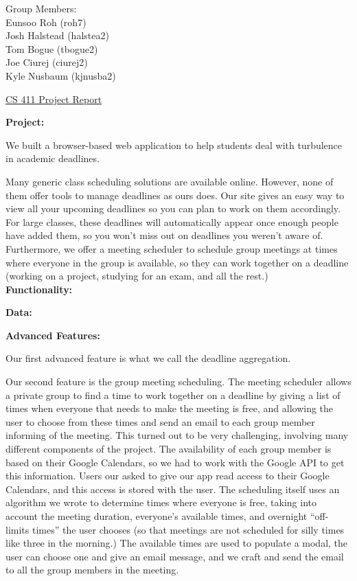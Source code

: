 \documentclass{article}
\begin{document}
\begin{flushright}
Group Members:\\
Eunsoo Roh (roh7)\\
Josh Halstead (halstea2)\\
Tom Bogue (tbogue2)\\
Joe Ciurej (ciurej2)\\
Kyle Nusbaum (kjnusba2)\\
\end{flushright}

\begin{center}
{\LARGE \underline{CS 411 Project Report}}
\end{center}

{\bf Project:}

We built a browser-based web application to help students deal with turbulence in academic deadlines.

Many generic class scheduling solutions are available online. However, none of them offer tools to manage deadlines as ours does. Our site gives an easy way to view all your upcoming deadlines so you can plan to work on them accordingly. For large classes, these deadlines will automatically appear once enough people have added them, so you won't miss out on deadlines you weren't aware of. Furthermore, we offer a meeting scheduler to schedule group meetings at times where everyone in the group is available, so they can work together on a deadline (working on a project, studying for an exam, and all the rest.)\\

{\bf Functionality:}

{\bf Data:}

{\bf Advanced Features:}

Our first advanced feature is what we call the deadline aggregation.

Our second feature is the group meeting scheduling. The meeting scheduler allows a private group to find a time to work together on a deadline by giving a list of times when everyone that needs to make the meeting is free, and allowing the user to choose from these times and send an email to each group member informing of the meeting. This turned out to be very challenging, involving many different components of the project. The availability of each group member is based on their Google Calendars, so we had to work with the Google API to get this information. Users our asked to give our app read access to their Google Calendars, and this access is stored with the user. The scheduling itself uses an algorithm we wrote to determine times where everyone is free, taking into account the meeting duration, everyone's available times, and overnight ``off-limits times'' the user chooses (so that meetings are not scheduled for silly times like three in the morning.) The available times are used to populate a modal, the user can choose one and give an email message, and we craft and send the email to all the group members in the meeting.\\
\end{document}
